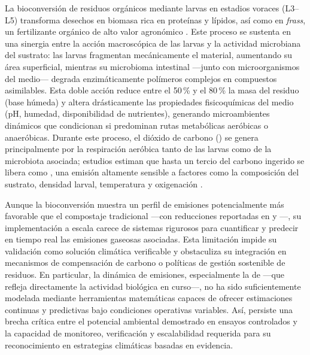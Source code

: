 La bioconversión de residuos orgánicos mediante larvas en estadios voraces (L3--L5) transforma desechos en biomasa rica en proteínas y lípidos, así como en \textit{frass}, un fertilizante orgánico de alto valor agronómico \parencite{Surendra2016,bermudezComprehensiveUtilizationBlack2023,singhInclusiveApproachOrganic2019}. Este proceso se sustenta en una sinergia entre la acción macroscópica de las larvas y la actividad microbiana del sustrato: las larvas fragmentan mecánicamente el material, aumentando su área superficial, mientras su microbioma intestinal ---junto con microorganismos del medio--- degrada enzimáticamente polímeros complejos en compuestos asimilables. Esta doble acción reduce entre el 50\,\% y el 80\,\% la masa del residuo (base húmeda) y altera drásticamente las propiedades fisicoquímicas del medio (pH, humedad, disponibilidad de nutrientes), generando microambientes dinámicos que condicionan si predominan rutas metabólicas aeróbicas o anaeróbicas. Durante este proceso, el dióxido de carbono () se genera principalmente por la respiración aeróbica tanto de las larvas como de la microbiota asociada; estudios estiman que hasta un tercio del carbono ingerido se libera como  \parencite{dienerConversionOrganicMaterial2009}, una emisión altamente sensible a factores como la composición del sustrato, densidad larval, temperatura y oxigenación \parencite{rossiEstimatingDynamicsGreenhouse2024,bekkerImpactSubstrateMoisture2021a,eriksenDynamicModellingFeed2022}.

Aunque la bioconversión muestra un perfil de emisiones potencialmente más favorable que el compostaje tradicional ---con reducciones reportadas en  y  \parencite{jenkinsProcessingPoultryManure2025}---, su implementación a escala carece de sistemas rigurosos para cuantificar y predecir en tiempo real las emisiones gaseosas asociadas. Esta limitación impide su validación como solución climática verificable y obstaculiza su integración en mecanismos de compensación de carbono o políticas de gestión sostenible de residuos. En particular, la dinámica de emisiones, especialmente la de  ---que refleja directamente la actividad biológica en curso---, no ha sido suficientemente modelada mediante herramientas matemáticas capaces de ofrecer estimaciones continuas y predictivas bajo condiciones operativas variables. Así, persiste una brecha crítica entre el potencial ambiental demostrado en ensayos controlados y la capacidad de monitoreo, verificación y escalabilidad requerida para su reconocimiento en estrategias climáticas basadas en evidencia.

